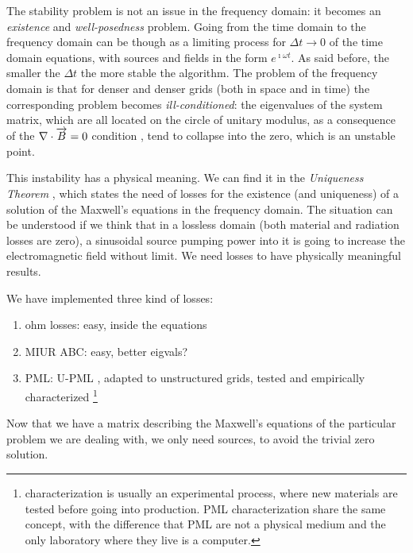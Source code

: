 
The stability problem is not an issue in the frequency domain: it
becomes an \emph{existence} and \emph{well-posedness} problem. Going
from the time domain to the frequency domain can be though as a
limiting process for $\Delta t \to 0$ of the time domain equations,
with sources and fields in the form $e^{\imath \omega t}$. As
said before, the smaller the $\Delta t$ the more stable the
algorithm. The problem of the frequency domain is that for denser and
denser grids (both in space and in time) the corresponding problem
becomes \emph{ill-conditioned}: the eigenvalues of the system matrix,
which are all located on the circle of unitary modulus, as a
consequence of the ${\nabla \cdot \overrightarrow{B}} = 0$ condition , tend to collapse into the zero, which is an unstable
point.



This instability has a physical meaning. We can find it in the
\emph{Uniqueness Theorem} \cite{someda_electromagnetic}, which states
the need of losses for the existence (and uniqueness) of a solution of
the Maxwell's equations in the frequency domain. The situation can be
understood if we think that in a lossless domain (both material and
radiation losses are zero), a sinusoidal source pumping power into it
is going to increase the electromagnetic field without limit. We need
losses to have physically meaningful results.

We have implemented three kind of losses:
\begin{enumerate}
\item
  ohm losses: easy, inside the equations
\item
  MIUR ABC: easy, better eigvals?
\item
  PML: U-PML \cite{taflove_computational}, adapted to unstructured
  grids, tested and empirically characterized
  \footnote{characterization is usually an experimental process, where
  new materials are tested before going into production. PML
  characterization share the same concept, with the difference that
  PML are not a physical medium and the only laboratory where they
  live is a computer.}
\end{enumerate}

Now that we have a matrix describing the Maxwell's equations of the
particular problem we are dealing with, we only need sources, to avoid
the trivial zero solution.

